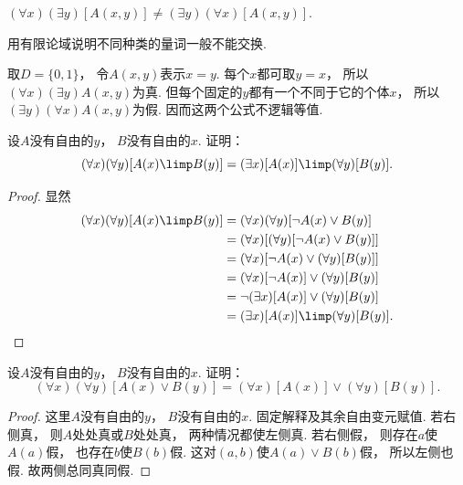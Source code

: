 \begin{remark}
\((\forall x)(\exists y)[A(x,y)]
\neq (\exists y)(\forall x)[A(x,y)]\).
\end{remark}
\begin{example}
    用有限论域说明不同种类的量词一般不能交换.
    \begin{solution}
        取\(D=\{0,1\}\)，
        令\(A(x,y)\)表示\(x=y\).
        每个\(x\)都可取\(y=x\)，
        所以\((\forall x)(\exists y)A(x,y)\)为真.
        但每个固定的\(y\)都有一个不同于它的个体\(x\)，
        所以\((\exists y)(\forall x)A(x,y)\)为假.
        因而这两个公式不逻辑等值.
    \end{solution}
\end{example}

\begin{example}
    设\(A\)没有自由的\(y\)，
    \(B\)没有自由的\(x\).
证明：\begin{equation}
	(\forall x)(\forall y)[A(x) \limp B(y)]
	= (\exists x)[A(x)] \limp (\forall y)[B(y)].
\end{equation}
\begin{proof}
显然\begin{align*}
	(\forall x)(\forall y)[A(x) \limp B(y)]
	&= (\forall x)(\forall y)[\neg A(x) \lor B(y)] \\
	&= (\forall x)
		[
			(\forall y)
			[
				\neg A(x) \lor B(y)
			]
		] \\
	&= (\forall x)
		[
			\neg A(x)
			\lor
			(\forall y)[B(y)]
		] \\
	&= (\forall x)[\neg A(x)] \lor (\forall y)[B(y)] \\
	&= \neg(\exists x)[A(x)] \lor (\forall y)[B(y)] \\
	&= (\exists x)[A(x)] \limp (\forall y)[B(y)].
	\qedhere
\end{align*}
\end{proof}
\end{example}

\begin{example}
    设\(A\)没有自由的\(y\)，
    \(B\)没有自由的\(x\).
证明：\begin{equation}
	(\forall x)(\forall y)[A(x) \lor B(y)]
	= (\forall x)[A(x)] \lor (\forall y)[B(y)].
\end{equation}
    \begin{proof}
        这里\(A\)没有自由的\(y\)，
        \(B\)没有自由的\(x\).
        固定解释及其余自由变元赋值.
        若右侧真，
        则\(A\)处处真或\(B\)处处真，
        两种情况都使左侧真.
        若右侧假，
        则存在\(a\)使\(A(a)\)假，
        也存在\(b\)使\(B(b)\)假.
        这对\((a,b)\)使\(A(a)\lor B(b)\)假，
        所以左侧也假.
        故两侧总同真同假.
    \end{proof}
\end{example}

